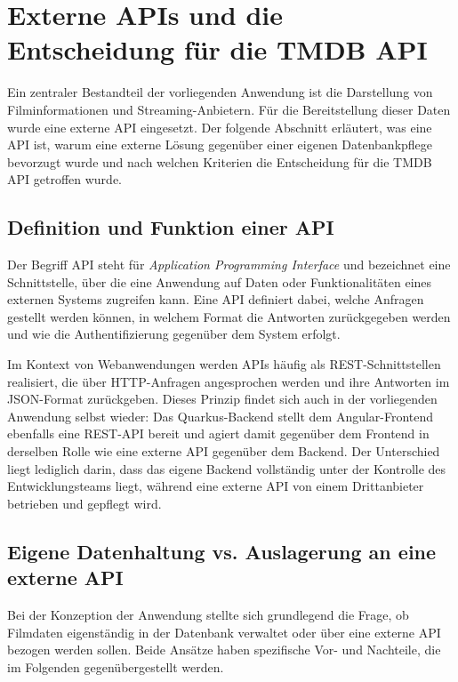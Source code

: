 \section{Externe APIs und die Entscheidung für die TMDB API}

Ein zentraler Bestandteil der vorliegenden Anwendung ist die Darstellung von
Filminformationen und Streaming-Anbietern. Für die Bereitstellung dieser Daten
wurde eine externe API eingesetzt. Der folgende Abschnitt erläutert, was eine
API ist, warum eine externe Lösung gegenüber einer eigenen Datenbankpflege
bevorzugt wurde und nach welchen Kriterien die Entscheidung für die TMDB API
getroffen wurde.


\subsection{Definition und Funktion einer API}

Der Begriff API steht für \textit{Application Programming Interface} und
bezeichnet eine Schnittstelle, über die eine Anwendung auf Daten oder
Funktionalitäten eines externen Systems zugreifen kann. Eine API definiert
dabei, welche Anfragen gestellt werden können, in welchem Format die Antworten
zurückgegeben werden und wie die Authentifizierung gegenüber dem System erfolgt.

Im Kontext von Webanwendungen werden APIs häufig als REST-Schnittstellen
realisiert, die über HTTP-Anfragen angesprochen werden und ihre Antworten im
JSON-Format zurückgeben. Dieses Prinzip findet sich auch in der vorliegenden
Anwendung selbst wieder: Das Quarkus-Backend stellt dem Angular-Frontend
ebenfalls eine REST-API bereit und agiert damit gegenüber dem Frontend in
derselben Rolle wie eine externe API gegenüber dem Backend. Der Unterschied
liegt lediglich darin, dass das eigene Backend vollständig unter der Kontrolle
des Entwicklungsteams liegt, während eine externe API von einem Drittanbieter
betrieben und gepflegt wird.


\subsection{Eigene Datenhaltung vs. Auslagerung an eine externe API}

Bei der Konzeption der Anwendung stellte sich grundlegend die Frage, ob
Filmdaten eigenständig in der Datenbank verwaltet oder über eine externe
API bezogen werden sollen. Beide Ansätze haben spezifische Vor- und Nachteile,
die im Folgenden gegenübergestellt werden.


